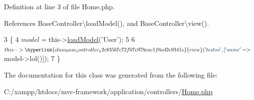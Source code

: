 Definition at line 3 of file Home.\+php.



References Base\+Controller\textbackslash{}load\+Model(), and Base\+Controller\textbackslash{}view().


\begin{DoxyCode}
3                                       \{
4         $model = $this->\hyperlink{class_base_controller_a31925ff6c6c23e4015d45a44c78a461b}{loadModel}(\textcolor{stringliteral}{'User'});
5 
6         $this->\hyperlink{class_base_controller_a2c835b7c72f07e978eac1f6ed2e9341e}{view}(\textcolor{stringliteral}{'testss'}, [\textcolor{stringliteral}{'name'} => $model->lol()]);
7     \}
\end{DoxyCode}


The documentation for this class was generated from the following file\+:\begin{DoxyCompactItemize}
\item 
C\+:/xampp/htdocs/mvc-\/framework/application/controllers/\hyperlink{_home_8php}{Home.\+php}\end{DoxyCompactItemize}
